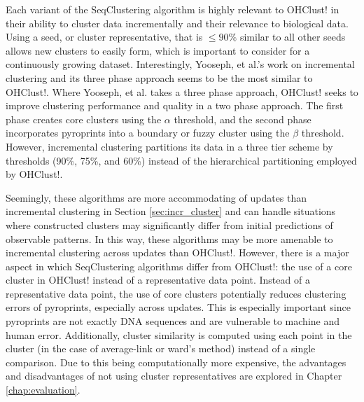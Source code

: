 \documentclass[12pt]{ucthesis}
\begin{document}
   Each variant of the SeqClustering algorithm is highly relevant to \textsf{OHClust!}
   in their ability to cluster data incrementally and their relevance to
   biological data. Using a seed, or cluster representative, that is $\le 90\%$
   similar to all other seeds allows new clusters to easily form, which is
   important to consider for a continuously growing dataset. Interestingly,
   Yooseph, et al.'s work on incremental clustering and its three phase
   approach seems to be the most similar to \textsf{OHClust!}. Where Yooseph, et al.
   takes a three phase approach, \textsf{OHClust!} seeks to improve clustering
   performance and quality in a two phase approach. The first phase creates
   core clusters using the $\alpha$ threshold, and the second phase
   incorporates pyroprints into a boundary or fuzzy cluster using the $\beta$
   threshold. However, incremental clustering partitions its data in a three
   tier scheme by thresholds (90\%, 75\%, and 60\%) instead of the hierarchical
   partitioning employed by \textsf{OHClust!}.
   
   Seemingly, these algorithms are more accommodating of updates than
   incremental clustering in Section \ref{sec:incr_cluster} and can handle
   situations where constructed clusters may significantly differ from initial
   predictions of observable patterns. In this way, these algorithms may be
   more amenable to incremental clustering across updates than \textsf{OHClust!}.
   However, there is a major aspect in which SeqClustering algorithms differ
   from \textsf{OHClust!}: the use of a core cluster in \textsf{OHClust!} instead of a
   representative data point. Instead of a representative data point, the use
   of core clusters potentially reduces clustering errors of pyroprints,
   especially across updates. This is especially important since pyroprints are
   not exactly DNA sequences and are vulnerable to machine and human error.
   Additionally, cluster similarity is computed using each point in the cluster
   (in the case of average-link or ward's method) instead of a single
   comparison. Due to this being computationally more expensive, the advantages
   and disadvantages of not using cluster representatives are explored in
   Chapter \ref{chap:evaluation}.
\end{document}
